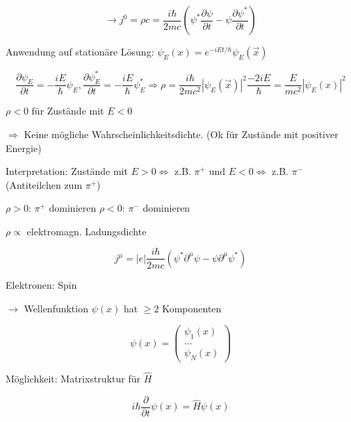 \[\rightarrow j^0 = \rho c =  \frac{i\hbar}{2mc}(\psi^*\frac{\partial\psi}{\partial t} - \psi\frac{\partial\psi^*}{\partial t}) \]

Anwendung auf stationäre Lösung: \(\psi_E(x) = e^{-iEt/\hbar}\psi_E(\vec x)\)

\[\frac{\partial \psi_E}{\partial t} = -\frac{iE}{\hbar}\psi_E,\frac{\partial \psi_E^*}{\partial t} = -\frac{iE}{\hbar}\psi_E^* \Rightarrow \rho = \frac{i\hbar}{2mc^2}|\psi_E(\vec x)|^2\frac{-2iE}{\hbar} = \frac{E}{mc^2}|\psi_E(x)|^2 \]

\(\rho < 0\) für Zustände mit \(E<0\)

\(\Rightarrow  \) Keine mögliche Wahrscheinlichkeitsdichte. (Ok für Zustände mit positiver Energie)

Interpretation: Zustände mit \(E>0\Leftrightarrow \) z.B. \(\pi^+\) und  \(E<0\Leftrightarrow \) z.B. \(\pi^-\)(Antiteilchen zum  \(\pi^+\))

\(\rho > 0\): \(\pi^+\) dominieren
\(\rho < 0\): \(\pi^-\) dominieren

\(\rho \propto\) elektromagn. Ladungsdichte

\[ j^\mu = |e|\frac{i\hbar}{2mc} (\psi^*\partial^\mu\psi -\psi\partial^\mu\psi^* )\]


Elektronen: Spin

\(\rightarrow \) Wellenfunktion \(\psi(x)\) hat \(\geq 2\) Komponenten

\[\psi(x) =\begin{pmatrix} \psi_1(x)\\ ...\\ \psi_N(x) \end{pmatrix} \]

Möglichkeit: Matrixstruktur für \(\hat H\)

\[i\hbar \frac{\partial}{\partial t}\psi(x) = \hat H \psi(x)\]


